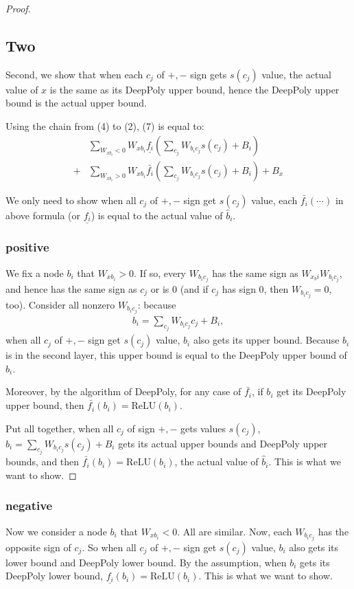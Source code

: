 \documentclass[]{article}
\theoremstyle{definition}
\newcommand{\ReLU}{\mathrm{ReLU}}
\begin{document}
\begin{proof}
\subsection*{Two} Second, we show that when each $c_j$ of $+,-$ sign gets $s(c_j)$ value, the actual value of $x$ is the same as its DeepPoly upper bound, hence the DeepPoly upper bound is the actual upper bound.

Using the chain from (4) to (2), (7) is equal to: \begin{align*}
&\sum_{W_{xb_i}<0}W_{xb_i}\underline{f_i}(\sum_{c_j}W_{b_ic_j}s(c_j)+B_i)\\
+&\sum_{W_{xb_i}>0}W_{xb_i}\bar{f_i}(\sum_{c_j}W_{b_ic_j}s(c_j)+B_i)+B_x
\end{align*} 

We only need to show when all $c_j$ of $+,-$ sign get $s(c_j)$ value, each $\bar{f_i}(\cdots)$ in above formula (or $\underline{f_i}$) is equal to the actual value of $\hat{b}_i$. 

\subsubsection*{positive} We fix a node $b_i$ that $W_{xb_i}>0$. If so, every $W_{b_ic_j}$ has the same sign as $W_{x_bi}W_{b_ic_j}$, and hence has the same sign as $c_j$ or is $0$ (and if $c_j$ has sign $0$, then $W_{b_ic_j}=0$, too). Consider all nonzero $W_{b_ic_j}$: because \begin{align}
	b_i = \sum_{c_j} W_{b_ic_j}c_j+B_i,
\end{align}  when all $c_j$ of $+,-$ sign get $s(c_j)$ value, $b_i$ also gets its upper bound. Because $b_i$ is in the second layer, this upper bound is equal to the DeepPoly upper bound of $b_i$. 


Moreover, by the algorithm of DeepPoly, for any case of $\bar{f_i}$, if $b_i$ get its DeepPoly upper bound, then $\bar{f_i}(b_i)=\ReLU(b_i)$. 

Put all together, when all $c_j$ of sign $+,-$ gets values $s(c_j)$, $b_i=\sum_{c_j}W_{b_ic_j}s(c_j)+B_i$ gets its actual upper bounds and DeepPoly upper bounds, and then  $\bar{f_i}(b_i)=\ReLU(b_i)$, the actual value of $\hat{b}_i$. This is what we want to show.
\end{proof}



\subsubsection*{negative}Now we consider a node $b_i$ that $W_{xb_i}<0$. All are similar. Now, each $W_{b_ic_j}$ has the opposite sign of $c_j$. So when all $c_j$ of $+,-$ sign get $s(c_j)$ value, $b_i$ also gets its lower bound and DeepPoly lower bound. By the assumption, when $b_i$ gets its DeepPoly lower bound, $\underline{f_i}(b_i)=\ReLU(b_i)$. This is what we want to show.
\end{document}
